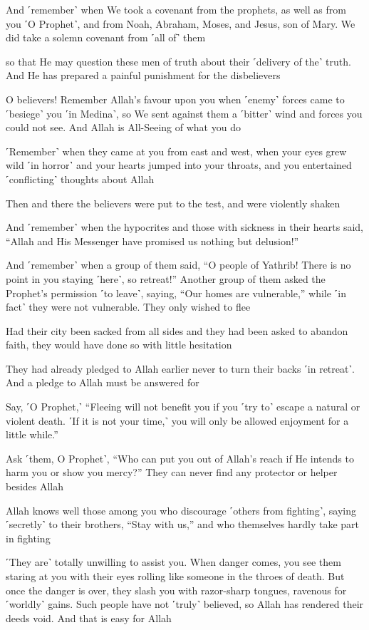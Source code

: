 And ˹remember˺ when We took a covenant from the prophets, as well as from you ˹O Prophet˺, and from Noah, Abraham, Moses, and Jesus, son of Mary. We did take a solemn covenant from ˹all of˺ them

so that He may question these men of truth about their ˹delivery of the˺ truth. And He has prepared a painful punishment for the disbelievers

O believers! Remember Allah’s favour upon you when ˹enemy˺ forces came to ˹besiege˺ you ˹in Medina˺, so We sent against them a ˹bitter˺ wind and forces you could not see. And Allah is All-Seeing of what you do

˹Remember˺ when they came at you from east and west, when your eyes grew wild ˹in horror˺ and your hearts jumped into your throats, and you entertained ˹conflicting˺ thoughts about Allah

Then and there the believers were put to the test, and were violently shaken

And ˹remember˺ when the hypocrites and those with sickness in their hearts said, “Allah and His Messenger have promised us nothing but delusion!”

And ˹remember˺ when a group of them said, “O people of Yathrib! There is no point in you staying ˹here˺, so retreat!” Another group of them asked the Prophet’s permission ˹to leave˺, saying, “Our homes are vulnerable,” while ˹in fact˺ they were not vulnerable. They only wished to flee

Had their city been sacked from all sides and they had been asked to abandon faith, they would have done so with little hesitation

They had already pledged to Allah earlier never to turn their backs ˹in retreat˺. And a pledge to Allah must be answered for

Say, ˹O Prophet,˺ “Fleeing will not benefit you if you ˹try to˺ escape a natural or violent death. ˹If it is not your time,˺ you will only be allowed enjoyment for a little while.”

Ask ˹them, O Prophet˺, “Who can put you out of Allah’s reach if He intends to harm you or show you mercy?” They can never find any protector or helper besides Allah

Allah knows well those among you who discourage ˹others from fighting˺, saying ˹secretly˺ to their brothers, “Stay with us,” and who themselves hardly take part in fighting

˹They are˺ totally unwilling to assist you. When danger comes, you see them staring at you with their eyes rolling like someone in the throes of death. But once the danger is over, they slash you with razor-sharp tongues, ravenous for ˹worldly˺ gains. Such people have not ˹truly˺ believed, so Allah has rendered their deeds void. And that is easy for Allah

